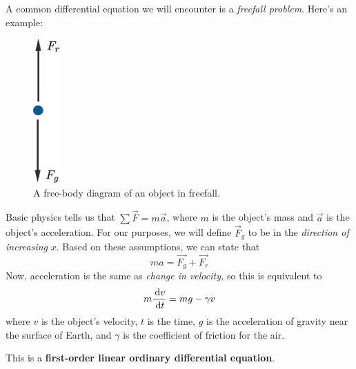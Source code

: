 A common differential equation we will encounter is a \emph{freefall problem}.
Here's an example:

\begin{figure}[H]
  \begin{center}
    \includegraphics[width=1cm]{continuous/ode/freefall.eps}
  \end{center}
  \caption{A free-body diagram of an object in freefall.}
  \label{fig:freefall}
\end{figure}

Basic physics tells us that $\sum \vec F = m\vec a$,
where $m$ is the object's mass and $\vec{a}$ is the object's acceleration.
For our purposes, we will define $\vec F_g$ to be in the \emph{direction of increasing} $x$.
Based on these assumptions, we can state that
\[
  ma=\vec{F_g}+\vec{F_r}
  \]
Now, acceleration is the same as \emph{change in velocity,} so this is equivalent to
\[
  m\frac{\,\mathrm{d} v}{\,\mathrm{d} t}=mg - \gamma v
  \]
where $v$ is the object's velocity, $t$ is the time, $g$ is the acceleration of gravity near the surface of Earth, and $\gamma$ is the coefficient of friction for the air.

This is a \textbf{first-order linear ordinary differential equation}.
